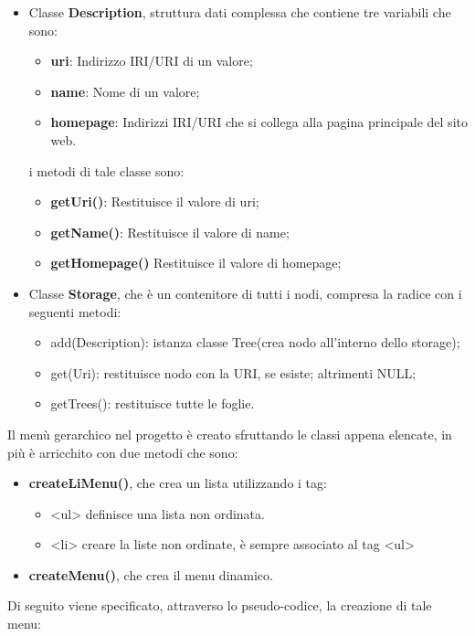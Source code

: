 \documentclass[a4paper,11pt]{article}
\begin{document}
\begin{enumerate}
\begin{enumerate}[label*=\arabic*.]
\begin{itemize}
			
	\item Classe \textbf{Description}, struttura dati complessa che contiene tre variabili che sono:
		\begin{itemize}
			\item \textbf{uri}: Indirizzo IRI/URI di un valore;
			\item \textbf{name}: Nome di un valore;
			\item \textbf{homepage}: Indirizzi IRI/URI che si collega alla pagina principale del sito web.
		\end{itemize}
	
	i metodi di tale classe sono:
		\begin{itemize}
			\item \textbf{getUri()}: Restituisce il valore di uri;
			\item \textbf{getName()}: Restituisce il valore di name;
			\item \textbf{getHomepage()} Restituisce il valore di homepage;
		\end{itemize}
	\item Classe \textbf{Storage}, che è un contenitore di tutti i nodi, compresa la radice con i seguenti metodi:
		\begin{itemize}
		\item add(Description): istanza classe Tree(crea nodo all'interno dello storage);
		\item get(Uri): restituisce nodo con la URI, se esiste; altrimenti NULL;
		\item getTrees(): restituisce tutte le foglie.
		\end{itemize}
\end{itemize}	
Il menù gerarchico nel progetto è creato sfruttando le classi appena elencate, in più è arricchito con due metodi che sono:
	\begin{itemize}
		\item \textbf{createLiMenu()}, che crea un lista utilizzando i tag:
		\begin{itemize}
			\item <ul> definisce una lista non ordinata.
			\item <li> creare la liste non ordinate, è sempre associato al tag <ul>
		\end{itemize}
		\item \textbf{createMenu()}, che crea il menu dinamico.
	\end{itemize}
Di seguito viene specificato, attraverso lo pseudo-codice, la creazione di tale menu:\newline

\end{enumerate}
\end{enumerate}
\end{document}
